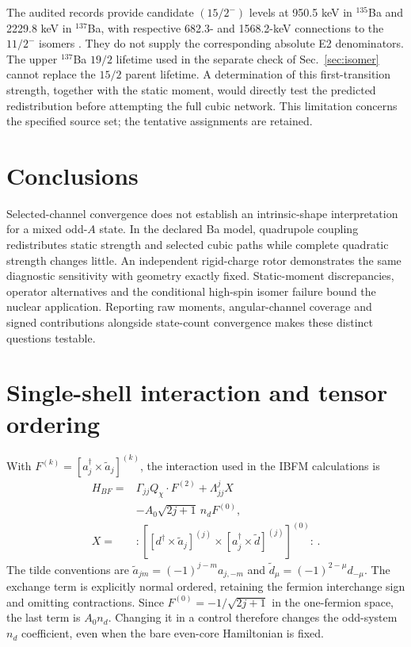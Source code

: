 \documentclass[pdflatex,iicol,sn-mathphys-num]{sn-jnl}
\begin{document}
The audited records provide candidate $(15/2^-)$ levels at 950.5 keV
in $^{135}$Ba and 2229.8 keV in $^{137}$Ba, with respective 682.3-
and 1568.2-keV connections to the $11/2^-$ isomers
\cite{ENSDF,Vogt2017PRC95_024316}. They do not supply the corresponding
absolute E2 denominators. The upper $^{137}$Ba $19/2$ lifetime used
in the separate check of Sec.~\ref{sec:isomer} cannot replace the
$15/2$ parent lifetime. A determination of this first-transition strength,
together with the static moment, would directly test the predicted
redistribution before attempting the full cubic network.
This limitation concerns the specified source set; the tentative assignments
are retained.

\section{Conclusions}\label{sec:conclusion}

Selected-channel convergence does not establish an intrinsic-shape
interpretation for a mixed odd-$A$ state. In the declared Ba model,
quadrupole coupling redistributes static strength and selected cubic paths
while complete quadratic strength changes little. An independent
rigid-charge rotor demonstrates the same diagnostic sensitivity with
geometry exactly fixed. Static-moment discrepancies, operator alternatives
and the conditional high-spin isomer failure bound the nuclear application.
Reporting raw moments, angular-channel coverage and signed contributions
alongside state-count convergence makes these distinct questions testable.

\appendix
\section{Single-shell interaction and tensor ordering}\label{app:conventions}

With $F^{(k)}=[a_j^\dagger\times\widetilde a_j]^{(k)}$, the interaction
used in the IBFM calculations is
\begin{equation}
\begin{aligned}
H_{BF}={}&\Gamma_{jj} Q_\chi\cdot F^{(2)}
+\Lambda_{jj}^{j} X\\
&-A_0\sqrt{2j+1}\,n_dF^{(0)},\\
X={}&:\!\left[[d^\dagger\times\widetilde a_j]^{(j)}
\times[a_j^\dagger\times\widetilde d]^{(j)}\right]^{(0)}\!:\, .
\end{aligned}
\end{equation}
The tilde conventions are
$\widetilde a_{jm}=(-1)^{j-m}a_{j,-m}$ and
$\widetilde d_\mu=(-1)^{2-\mu}d_{-\mu}$.
The exchange term is explicitly normal ordered, retaining the fermion
interchange sign and omitting contractions.
Since $F^{(0)}=-1/\sqrt{2j+1}$ in the one-fermion space, the last term is
$A_0n_d$. Changing it in a control therefore changes the odd-system
$n_d$ coefficient, even when the bare even-core Hamiltonian is fixed.
\end{document}
